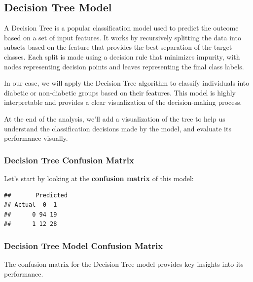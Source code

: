 \documentclass[
]{article}
\begin{document}
\newpage

\subsection{Decision Tree Model}\label{decision-tree-model}

A Decision Tree is a popular classification model used to predict the
outcome based on a set of input features. It works by recursively
splitting the data into subsets based on the feature that provides the
best separation of the target classes. Each split is made using a
decision rule that minimizes impurity, with nodes representing decision
points and leaves representing the final class labels.

In our case, we will apply the Decision Tree algorithm to classify
individuals into diabetic or non-diabetic groups based on their
features. This model is highly interpretable and provides a clear
visualization of the decision-making process.

At the end of the analysis, we'll add a visualization of the tree to
help us understand the classification decisions made by the model, and
evaluate its performance visually.

\subsubsection{Decision Tree Confusion
Matrix}\label{decision-tree-confusion-matrix}

Let's start by looking at the \textbf{confusion matrix} of this model:

\begin{verbatim}
##       Predicted
## Actual  0  1
##      0 94 19
##      1 12 28
\end{verbatim}

\subsubsection{Decision Tree Model Confusion
Matrix}\label{decision-tree-model-confusion-matrix}

The confusion matrix for the Decision Tree model provides key insights
into its performance.
\end{document}
